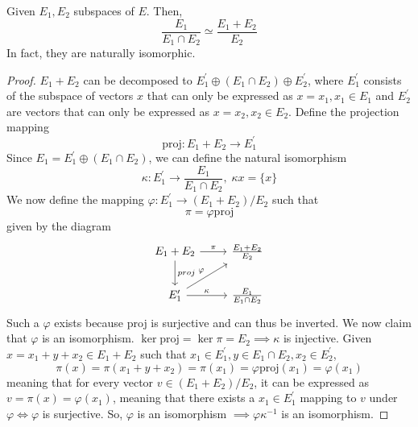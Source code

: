   \begin{proposition}
    Given $E_1, E_2$ subspaces of $E$. Then, 
    \begin{equation}
      \frac{E_1}{E_1 \cap E_2} \simeq \frac{E_1 + E_2}{E_2}
    \end{equation}
    In fact, they are naturally isomorphic. 
  \end{proposition}
  \begin{proof}
    $E_1 + E_2$ can be decomposed to $E_1^\prime \oplus (E_1 \cap E_2) \oplus E_2^\prime$, where $E_1^\prime$ consists of the subspace of vectors $x$ that can only be expressed as $x = x_1, x_1 \in E_1$ and $E_2^\prime$ are vectors that can only be expressed as $x = x_2, x_2 \in E_2$. Define the projection mapping
    \begin{equation}
      \text{proj}: E_1 + E_2 \longrightarrow E_1^\prime
    \end{equation}
    Since $E_1 = E_1^\prime \oplus (E_1 \cap E_2)$, we can define the natural isomorphism 
    \begin{equation}
      \kappa: E_1^\prime \longrightarrow \frac{E_1}{E_1 \cap E_2}, \; \kappa{x} = \{x\}
    \end{equation}
    We now define the mapping $\varphi: E_1^\prime \longrightarrow (E_1 + E_2) / E_2$ such that
    \begin{equation}
      \pi = \varphi \text{proj}
    \end{equation}
    given by the diagram 
    \[\begin{tikzcd} 
        E_1 + E_2 \arrow{d}{proj} \arrow{r}{\pi} & \frac{E_1 + E_2}{E_2} \\
        E_1^\prime \arrow{ru}{\varphi} \arrow{r}{\kappa} & \frac{E_1}{E_1 \cap E_2}
    \end{tikzcd}\]
    Such a $\varphi$ exists because proj is surjective and can thus be inverted. We now claim that $\varphi$ is an isomorphism. $\ker{\text{proj}} = \ker{\pi} = E_2 \implies \kappa$ is injective. Given $x = x_1 + y + x_2 \in E_1 + E_2$ such that $x_1 \in E_1^\prime, y \in E_1 \cap E_2, x_2 \in E_2^\prime$, 
    \begin{equation}
      \pi(x) = \pi(x_1 + y + x_2) = \pi(x_1) = \varphi \text{proj} (x_1) = \varphi (x_1)
    \end{equation}
    meaning that for every vector $v \in (E_1 + E_2) / E_2$, it can be expressed as $v = \pi (x) = \varphi (x_1)$, meaning that there exists a $x_1 \in E_1^\prime$ mapping to $v$ under $\varphi \iff \varphi$ is surjective. So, $\varphi$ is an isomorphism $\implies \varphi \kappa^{-1}$ is an isomorphism.  
  \end{proof}

